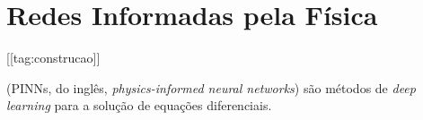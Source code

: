 
\chapter{Redes Informadas pela Física}\label{cap_pinns}
\thispagestyle{fancy}
[[tag:construcao]]

 (PINNs, do inglês, \textit{physics-informed neural networks}) são métodos de \textit{deep learning} para a solução de equações diferenciais.





